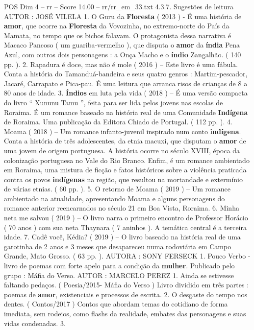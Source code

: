 \begin{textsample}{POS Dim 4 – rr – Score 14.00 – rr/rr\_em\_33.txt}  \label{ex:f4_pos_112}
4.3.7.
Sugestões de leitura AUTOR : JOSÉ VILELA 1.
O Guru da \textbf{Floresta} ( 2013 ) - É uma história de \textbf{amor}, que ocorre na \textbf{Floresta} da Vovozinha, no extremo-norte do País da Mamata, no tempo que os bichos falavam.
O protagonista dessa narrativa é Macaco Pancoso ( um guariba-vermelho ), que disputa o \textbf{amor} da \textbf{índia} Pena Azul, com outros dois personagens : a Onça Macho e o \textbf{índio} Zangalhão. ( 140 pp. ). 2.
Rapadura é doce, mas não é mole ( 2016 ) – Este livro é uma fábula.
Conta a história do Tamanduá-bandeira e seus quatro genros : Martim-pescador, Jacaré, Carrapato e Pica-pau.
É uma leitura que arranca risos de crianças de 8 a 80 anos de idade. 3. \textbf{Índios} em luta pela vida ( 2018 ) – É uma versão compacta do livro “ Xununu Tamu ”, feita para ser lida pelos jovens nas escolas de Roraima.
É um romance baseado na história real de uma Comunidade \textbf{Indígena} de Roraima.
Uma publicação da Editora Chiado de Portugal. ( 112 pp. ). 4.
Moama ( 2018 ) – Um romance infanto-juvenil inspirado num conto \textbf{indígena}.
Conta a história de três adolescentes, da etnia macuxi, que disputam o \textbf{amor} de uma jovem de origem portuguesa.
A história ocorre no século XVIII, época da colonização portuguesa no Vale do Rio Branco.
Enfim, é um romance ambientado em Roraima, uma mistura de ficção e fatos históricos sobre a violência praticada contra os povos \textbf{indígenas} na região, que resultou na mortandade e extermínio de várias etnias. ( 60 pp. ). 5.
O retorno de Moama ( 2019 ) – Um romance ambientado na atualidade, apresentando Moama e alguns personagens do romance anterior reencarnados no século 21 em Boa Vista, Roraima. 6.
Minha neta me salvou ( 2019 ) – O livro narra o primeiro encontro de Professor Horácio ( 70 anos ) com sua neta Thaynara ( 7 aninhos ).
A temática central é a terceira idade. 7.
Cadê você, Kédia? ( 2019 ) – O livro baseado na história real de uma garotinha de 2 anos e 3 meses que desapareceu numa rodoviária em Campo Grande, Mato Grosso. ( 63 pp. ).
AUTORA : SONY FERSECK 1.
Pouco Verbo - livro de poemas com forte apelo para a condição da \textbf{mulher}.
Publicado pelo grupo : Máfia do Verso.
AUTOR : MARCELO PEREZ 1.
Ainda se estivesse faltando pedaços. ( Poesia/2015- Máfia do Verso ) Livro dividido em três partes : poemas de \textbf{amor}, existenciais e processos de escrita. 2.
O desgaste do tempo nos dentes. ( Contos/2017 ) Contos que abordam temas do cotidiano de forma imediata, sem rodeios, como flashs da realidade, embates das personagens e suas vidas condenadas. 3.

\end{textsample}
